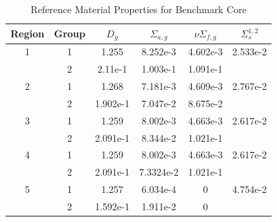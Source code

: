 \documentclass[11pt]{article}
\begin{document}
\begin{table}[h]
\centering
\begin{tabular}{c c | c c c c}
Region & Group & $D_g$ & $\Sigma_{a,g}$ & $\nu\Sigma_{f,g}$ & $\Sigma_s^{1,2}$ \\ \hline
1 & 1 & 1.255 & 8.252e-3 & 4.602e-3 & 2.533e-2 \\
 & 2 & 2.11e-1 & 1.003e-1 & 1.091e-1 & \\ \hline
2 & 1 & 1.268 & 7.181e-3 & 4.609e-3 & 2.767e-2 \\
 & 2 & 1.902e-1 & 7.047e-2 & 8.675e-2 & \\ \hline
3 & 1 & 1.259 & 8.002e-3 & 4.663e-3 & 2.617e-2 \\
 & 2 & 2.091e-1 & 8.344e-2 & 1.021e-1 & \\ \hline
4 & 1 & 1.259 & 8.002e-3 & 4.663e-3 & 2.617e-2 \\
 & 2 & 2.091e-1 & 7.3324e-2 & 1.021e-1 & \\ \hline
5 & 1 & 1.257 & 6.034e-4 & 0 & 4.754e-2 \\
 & 2 & 1.592e-1 & 1.911e-2 & 0 & 
\end{tabular}
\caption{Reference Material Properties for Benchmark Core}
\label{tab:coremats}
\end{table}
\end{document}
